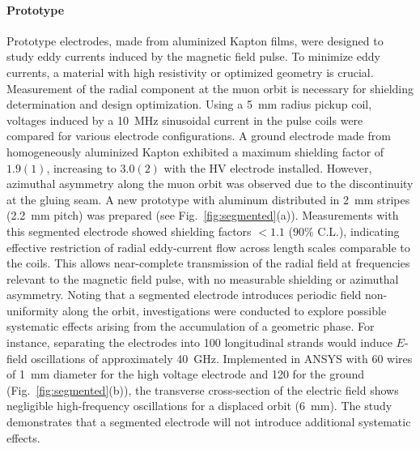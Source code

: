 \begin{refsection}
        \paragraph{Prototype}
        Prototype electrodes, made from aluminized Kapton films, were designed to study eddy currents induced by the magnetic field pulse. 
        To minimize eddy currents, a material with high resistivity or optimized geometry is crucial. 
        Measurement of the radial component at the muon orbit is necessary for shielding determination and design optimization.
        Using a \SI{5}{mm} radius pickup coil, voltages induced by a \SI{10}{\mega\hertz} sinusoidal current in the pulse coils were compared for various electrode configurations. 
        A ground electrode made from homogeneously aluminized Kapton exhibited a maximum shielding factor of $1.9(1)$, increasing to $3.0(2)$ with the HV electrode installed. 
        However, azimuthal asymmetry along the muon orbit was observed due to the discontinuity at the gluing seam.
        A new prototype with aluminum distributed in \SI{2}{mm} stripes (\SI{2.2}{mm} pitch) was prepared (see Fig.~\ref{fig:segmented}(a)). 
        Measurements with this segmented electrode showed shielding factors $<1.1$ ($90\%$ C.L.), indicating effective restriction of radial eddy-current flow across length scales comparable to the coils. 
        This allows near-complete transmission of the radial field at frequencies relevant to the magnetic field pulse, with no measurable shielding or azimuthal asymmetry.
        Noting that a segmented electrode introduces periodic field non-uniformity along the orbit, investigations were conducted to explore possible systematic effects arising from the accumulation of a geometric phase. 
        For instance, separating the electrodes into 100 longitudinal strands would induce $E$-field oscillations of approximately \SI{40}{\giga\hertz}.
        Implemented in ANSYS with 60 wires of \SI{1}{mm} diameter for the high voltage electrode and 120 for the ground (Fig.~\ref{fig:segmented}(b)), the transverse cross-section of the electric field shows negligible high-frequency oscillations for a displaced orbit (\SI{6}{mm}). The study demonstrates that a segmented electrode will not introduce additional systematic effects.
        

\end{refsection}
